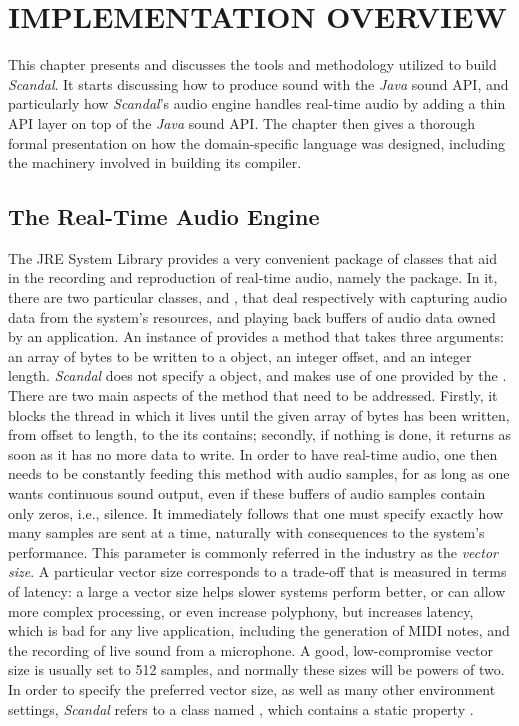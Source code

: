 \chapter{IMPLEMENTATION OVERVIEW}

This chapter presents and discusses the tools and methodology utilized to build \emph{Scandal}. It starts discussing how to produce sound with the \emph{Java} sound API, and particularly how \emph{Scandal}'s audio engine handles real-time audio by adding a thin API layer on top of the \emph{Java} sound API. The chapter then gives a thorough formal presentation on how the domain-specific language was designed, including the machinery involved in building its compiler.

\section{The Real-Time Audio Engine}

The JRE System Library provides a very convenient package of classes that aid in the recording and reproduction of real-time audio, namely the  package. In it, there are two particular classes,  and , that deal respectively with capturing audio data from the system's resources, and playing back buffers of audio data owned by an application. An instance of  provides a  method that takes three arguments: an array of bytes to be written to a  object, an integer offset, and an integer length. \emph{Scandal} does not specify a  object, and makes use of one provided by the . There are two main aspects of the  method that need to be addressed. Firstly, it blocks the thread in which it lives until the given array of bytes has been written, from offset to length, to the  its  contains; secondly, if nothing is done, it returns as soon as it has no more data to write. In order to have real-time audio, one then needs to be constantly feeding this  method with audio samples, for as long as one wants continuous sound output, even if these buffers of audio samples contain only zeros, i.e., silence. It immediately follows that one must specify exactly how many samples are sent at a time, naturally with consequences to the system's performance. This parameter is commonly referred in the industry as the \emph{vector size}. A particular vector size corresponds to a trade-off that is measured in terms of latency: a large a vector size helps slower systems perform better, or can allow more complex processing, or even increase polyphony, but increases latency, which is bad for any live application, including the generation of MIDI notes, and the recording of live sound from a microphone. A good, low-compromise vector size is usually set to 512 samples, and normally these sizes will be powers of two. In order to specify the preferred vector size, as well as many other environment settings, \emph{Scandal} refers to a class named , which contains a static property .

